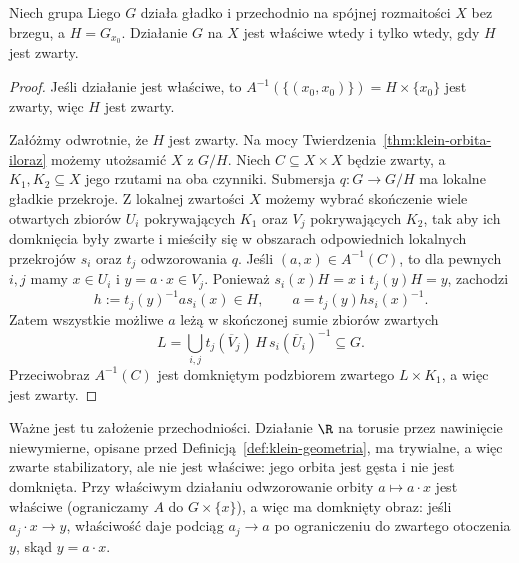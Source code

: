 \begin{stwierdzenie}
\label{prop:klein-zwarte-h-wlasciwe}
Niech grupa Liego $G$ działa gładko i przechodnio na spójnej
rozmaitości $X$ bez brzegu, a $H=G_{x_0}$.
Działanie $G$ na $X$ jest właściwe wtedy i tylko wtedy,
gdy $H$ jest zwarty.
\end{stwierdzenie}
\begin{proof}
Jeśli działanie jest właściwe, to
$A^{-1}(\{(x_0,x_0)\})=H\times\{x_0\}$ jest zwarty,
więc $H$ jest zwarty.

Załóżmy odwrotnie, że $H$ jest zwarty. Na mocy
Twierdzenia~\ref{thm:klein-orbita-iloraz} możemy utożsamić
$X$ z $G/H$. Niech $C\subseteq X\times X$ będzie zwarty,
a $K_1,K_2\subseteq X$ jego rzutami na oba czynniki.
Submersja $q:G\to G/H$ ma lokalne gładkie przekroje.
Z lokalnej zwartości $X$ możemy wybrać skończenie wiele
otwartych zbiorów $U_i$ pokrywających $K_1$ oraz $V_j$
pokrywających $K_2$, tak aby ich domknięcia były zwarte
i mieściły się w obszarach odpowiednich lokalnych przekrojów
$s_i$ oraz $t_j$ odwzorowania $q$.
Jeśli $(a,x)\in A^{-1}(C)$, to dla pewnych $i,j$ mamy
$x\in U_i$ i $y=a\cdot x\in V_j$. Ponieważ
$s_i(x)H=x$ i $t_j(y)H=y$, zachodzi
\[
 h:=t_j(y)^{-1}a s_i(x)\in H,
 \qquad
 a=t_j(y)h s_i(x)^{-1}.
\]
Zatem wszystkie możliwe $a$ leżą w skończonej sumie
zbiorów zwartych
\[
 L=\bigcup_{i,j}t_j(\overline V_j)\,
 H\,s_i(\overline U_i)^{-1}\subseteq G.
\]
Przeciwobraz $A^{-1}(C)$ jest domkniętym podzbiorem
zwartego $L\times K_1$, a więc jest zwarty.
\end{proof}

Ważne jest tu założenie przechodniości. Działanie $\R$ na
torusie przez nawinięcie niewymierne, opisane przed
Definicją~\ref{def:klein-geometria}, ma trywialne, a więc
zwarte stabilizatory, ale nie jest właściwe: jego orbita jest
gęsta i nie jest domknięta. Przy właściwym działaniu
odwzorowanie orbity $a\mapsto a\cdot x$ jest właściwe
(ograniczamy $A$ do $G\times\{x\}$), a więc ma domknięty obraz:
jeśli $a_j\cdot x\to y$, właściwość daje podciąg $a_j\to a$
po ograniczeniu do zwartego otoczenia $y$, skąd $y=a\cdot x$.

